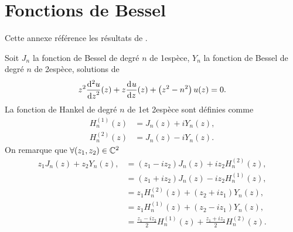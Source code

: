 \section{Fonctions de Bessel}

Cette annexe référence les résultats de \cite{abramowitz_handbook_1964}.

Soit \(J_n\) la fonction de Bessel de degré \(n\) de 1\iere espèce, \(Y_n\) la fonction de Bessel de degré \(n\) de 2\ieme espèce, solutions de
\begin{equation}
    z^2 \ddp[2]{z}{u}(z) + z\ddp{z}{u}(z)+\left(z^2-n^2\right)u(z) = 0.
\end{equation}
La fonction de Hankel de degré \(n\) de 1\iere et 2\ieme espèce sont définies comme
\begin{align}
    H_n^{(1)}(z) &= J_n(z) + iY_n(z),
    \\
    H_n^{(2)}(z) &= J_n(z) - iY_n(z).
\end{align}
On remarque que \(\forall (z_1,z_2) \in \CC^2\)
\begin{equation}
\begin{aligned}
z_1 J_n(z) + z_2 Y_n(z),
&= ( z_1 - i z_2 ) J_n(z) + iz_2 H_n^{(2)}(z),
\\
&= ( z_1 + i z_2 ) J_n(z) - iz_2 H_n^{(1)}(z),
\\
&= z_1 H_n^{(2)}(z) + ( z_2 + i z_1 ) Y_n(z),
\\
&= z_1 H_n^{(1)}(z) + ( z_2 - i z_1 ) Y_n(z),
\\
&= \frac{z_1-iz_2}{2}H_n^{(1)}(z) + \frac{z_1+iz_2}{2}H_n^{(2)}(z).
\end{aligned}
\label{eq:annex:bessel:equiv_bessel}
\end{equation}
